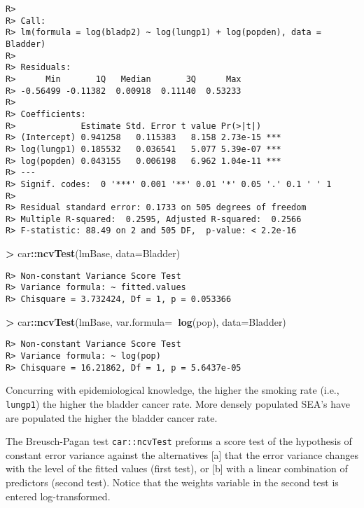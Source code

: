 \documentclass[
]{article}
\newenvironment{Shaded}{\begin{snugshade}}{\end{snugshade}}
\newcommand{\DataTypeTok}[1]{\textcolor[rgb]{0.13,0.29,0.53}{#1}}
\newcommand{\KeywordTok}[1]{\textcolor[rgb]{0.13,0.29,0.53}{\textbf{#1}}}
\newcommand{\NormalTok}[1]{#1}
\newcommand{\OperatorTok}[1]{\textcolor[rgb]{0.81,0.36,0.00}{\textbf{#1}}}
\newcommand{\StringTok}[1]{\textcolor[rgb]{0.31,0.60,0.02}{#1}}
\begin{document}
\begin{verbatim}
R> 
R> Call:
R> lm(formula = log(bladp2) ~ log(lungp1) + log(popden), data = Bladder)
R> 
R> Residuals:
R>      Min       1Q   Median       3Q      Max 
R> -0.56499 -0.11382  0.00918  0.11140  0.53233 
R> 
R> Coefficients:
R>             Estimate Std. Error t value Pr(>|t|)    
R> (Intercept) 0.941258   0.115383   8.158 2.73e-15 ***
R> log(lungp1) 0.185532   0.036541   5.077 5.39e-07 ***
R> log(popden) 0.043155   0.006198   6.962 1.04e-11 ***
R> ---
R> Signif. codes:  0 '***' 0.001 '**' 0.01 '*' 0.05 '.' 0.1 ' ' 1
R> 
R> Residual standard error: 0.1733 on 505 degrees of freedom
R> Multiple R-squared:  0.2595, Adjusted R-squared:  0.2566 
R> F-statistic: 88.49 on 2 and 505 DF,  p-value: < 2.2e-16
\end{verbatim}

\begin{Shaded}
\begin{Highlighting}[]
\OperatorTok{>}\StringTok{ }\NormalTok{car}\OperatorTok{::}\KeywordTok{ncvTest}\NormalTok{(lmBase, }\DataTypeTok{data=}\NormalTok{Bladder) }
\end{Highlighting}
\end{Shaded}

\begin{verbatim}
R> Non-constant Variance Score Test 
R> Variance formula: ~ fitted.values 
R> Chisquare = 3.732424, Df = 1, p = 0.053366
\end{verbatim}

\begin{Shaded}
\begin{Highlighting}[]
\OperatorTok{>}\StringTok{ }\NormalTok{car}\OperatorTok{::}\KeywordTok{ncvTest}\NormalTok{(lmBase, }\DataTypeTok{var.formula=}\OperatorTok{~}\KeywordTok{log}\NormalTok{(pop), }\DataTypeTok{data=}\NormalTok{Bladder)}
\end{Highlighting}
\end{Shaded}

\begin{verbatim}
R> Non-constant Variance Score Test 
R> Variance formula: ~ log(pop) 
R> Chisquare = 16.21862, Df = 1, p = 5.6437e-05
\end{verbatim}

Concurring with epidemiological knowledge, the higher the smoking rate
(i.e., \texttt{lungp1}) the higher the bladder cancer rate. More densely
populated SEA's have are populated the higher the bladder cancer rate.

The Breusch-Pagan test \texttt{car::ncvTest} preforms a score test of
the hypothesis of constant error variance against the alternatives
{[}a{]} that the error variance changes with the level of the fitted
values (first test), or {[}b{]} with a linear combination of predictors
(second test). Notice that the weights variable in the second test is
entered log-transformed.
\end{document}
